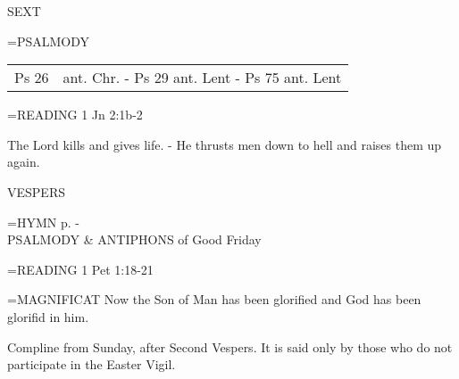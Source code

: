 \begin{flushleft}\normalsize SEXT\\\end{flushleft}
\hangindent=\parindent \small{PSALMODY}
\begin{center}
\begin{tabular}{ l l }
Ps 26 &  ant. Chr. - Ps 29 ant. Lent - Ps 75 ant. Lent\\
\end{tabular}
\end{center}		

\hangindent=\parindent \small{\uppercase{READING}}    1 Jn 2:1b-2 \textbf{   \\}

The Lord kills and gives life.
- He thrusts men down to hell and raises them up again.

\begin{flushleft}\normalsize VESPERS\\\end{flushleft}
\hangindent=\parindent \small{\uppercase{HYMN} p. \pageref{lent:firstHymn}-\pageref{lent:lastHymn}\\}
PSALMODY \& ANTIPHONS of Good Friday

\hangindent=\parindent \small{\uppercase{READING}}    1 Pet 1:18-21 \textbf{   \\}

\hangindent=\parindent \small{MAGNIFICAT 	Now the Son of Man has been glorified and God has been glorifid in him.\\}

Compline from Sunday, after Second Vespers. It is said only by those who do not participate in the Easter Vigil.
